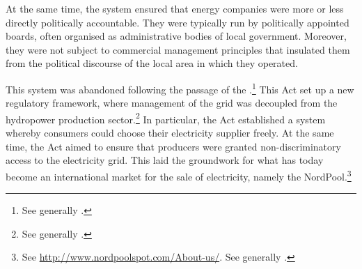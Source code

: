 At the same time, the system ensured that energy companies were more or less directly politically accountable. They were typically run by politically appointed boards, often organised as administrative bodies of local government. Moreover, they were not subject to commercial management principles that insulated them from the political discourse of the local area in which they operated.

This system was abandoned following the passage of the \cite{ea90}.\footnote{See generally \cite{bibow11}.} This Act set up a new regulatory framework, where management of the grid was decoupled from the hydropower production sector.\footnote{See generally \cite{bye05}.} In particular, the Act established a system whereby consumers could choose their electricity supplier freely. At the same time, the Act aimed to ensure that producers were granted non-discriminatory access to the electricity grid. This laid the groundwork for what has today become an international market for the sale of electricity, namely the NordPool.\footnote{See \url{http://www.nordpoolspot.com/About-us/}. See generally \cite{skjold07,galtung07}.}

